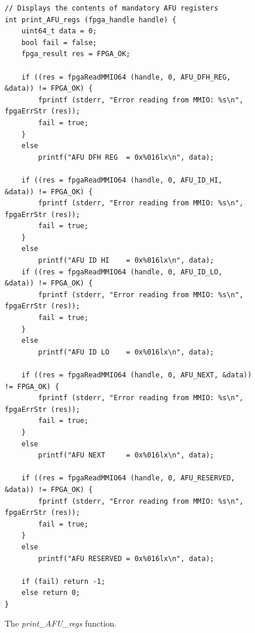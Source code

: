 \documentclass[11pt, twoside, pdftex]{article}
\begin{document}
\lstset{language=C,numbers=none,escapechar=|}
\begin{figure}[H]
\begin{center}
\begin{minipage}[h]{\textwidth}
\begin{lstlisting}[name=manage]
// Displays the contents of mandatory AFU registers
int print_AFU_regs (fpga_handle handle) {
    uint64_t data = 0;
    bool fail = false;
    fpga_result res = FPGA_OK;

    if ((res = fpgaReadMMIO64 (handle, 0, AFU_DFH_REG, &data)) != FPGA_OK) {
        fprintf (stderr, "Error reading from MMIO: %s\n", fpgaErrStr (res));
        fail = true;
    }
    else
        printf("AFU DFH REG  = 0x%016lx\n", data);

    if ((res = fpgaReadMMIO64 (handle, 0, AFU_ID_HI, &data)) != FPGA_OK) {
        fprintf (stderr, "Error reading from MMIO: %s\n", fpgaErrStr (res));
        fail = true;
    }
    else
        printf("AFU ID HI    = 0x%016lx\n", data);
    if ((res = fpgaReadMMIO64 (handle, 0, AFU_ID_LO, &data)) != FPGA_OK) {
        fprintf (stderr, "Error reading from MMIO: %s\n", fpgaErrStr (res));
        fail = true;
    }
    else
        printf("AFU ID LO    = 0x%016lx\n", data);
    
    if ((res = fpgaReadMMIO64 (handle, 0, AFU_NEXT, &data)) != FPGA_OK) {
        fprintf (stderr, "Error reading from MMIO: %s\n", fpgaErrStr (res));
        fail = true;
    }
    else
        printf("AFU NEXT     = 0x%016lx\n", data);
    
    if ((res = fpgaReadMMIO64 (handle, 0, AFU_RESERVED, &data)) != FPGA_OK) {
        fprintf (stderr, "Error reading from MMIO: %s\n", fpgaErrStr (res));
        fail = true;
    }
    else
        printf("AFU RESERVED = 0x%016lx\n", data);

    if (fail) return -1;
    else return 0;
}
\end{lstlisting}
\end{minipage}
\caption{The {\it print\_AFU\_regs} function.}
\label{fig:print}
\end{center}
\end{figure}
\end{document}

